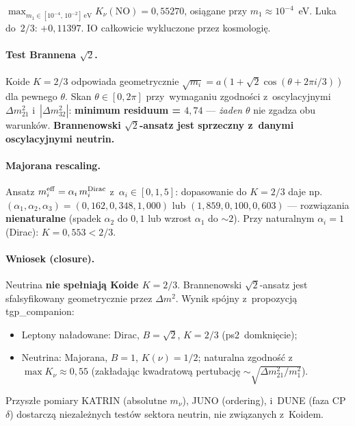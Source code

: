\noindent
$\boxed{\max_{m_1 \in [10^{-4},\,10^{-2}]~\mathrm{eV}} K_\nu(\text{NO}) = 0{,}55270}$,
osi\k{a}gane przy $m_1 \approx 10^{-4}$~eV.
Luka do~$2/3$: $+0{,}11397$. IO ca\l{}kowicie wykluczone przez kosmologi\k{e}.

\paragraph{Test Brannena $\sqrt{2}$.}
Koide $K=2/3$ odpowiada geometrycznie
$\sqrt{m_i} = a(1+\sqrt{2}\cos(\theta+2\pi i/3))$ dla pewnego $\theta$.
Skan $\theta \in [0, 2\pi]$ przy~wymaganiu zgodno\'sci z~oscylacyjnymi
$\Delta m^2_{21}$ i~$|\Delta m^2_{32}|$:
\textbf{minimum residuum = $4{,}74$} --- \emph{\.zaden} $\theta$
nie zgadza obu warunk\'ow.
\textbf{Brannenowski $\sqrt{2}$-ansatz jest sprzeczny z~danymi
oscylacyjnymi neutrin.}

\paragraph{Majorana rescaling.}
Ansatz $m_i^{\rm eff} = \alpha_i\,m_i^{\rm Dirac}$ z~$\alpha_i\in[0{,}1,5]$:
dopasowanie do $K=2/3$ daje np.\ $(\alpha_1,\alpha_2,\alpha_3)=(0{,}162, 0{,}348, 1{,}000)$
lub $(1{,}859, 0{,}100, 0{,}603)$ --- rozwi\k{a}zania \textbf{nienaturalne}
(spadek $\alpha_2$ do $0{,}1$ lub wzrost $\alpha_1$ do $\sim 2$).
Przy naturalnym $\alpha_i = 1$ (Dirac): $K=0{,}553 < 2/3$.

\paragraph{Wniosek (closure).}
Neutrina \textbf{nie spe\l{}niaj\k{a} Koide $K=2/3$}. Brannenowski
$\sqrt{2}$-ansatz jest sfalsyfikowany geometrycznie przez
$\Delta m^2$. Wynik spójny z~propozycj\k{a} tgp\_companion:
\begin{itemize}\itemsep0pt
  \item Leptony na\l{}adowane: Dirac, $B=\sqrt{2}$, $K=2/3$ (ps2~domkni\k{e}cie);
  \item Neutrina: Majorana, $B=1$, $K(\nu)=1/2$;
    naturalna zgodno\'s\'c z~$\max K_\nu \approx 0{,}55$
    (zak\l{}adaj\k{a}c kwadratow\k{a} pertubacj\k{e} $\sim \sqrt{\Delta m^2_{21}/m_1^2}$).
\end{itemize}
Przysz\l{}e pomiary KATRIN (absolutne $m_\nu$), JUNO (ordering),
i~DUNE (faza CP $\delta$) dostarcz\k{a} niezale\.znych test\'ow
sektora neutrin, nie zwi\k{a}zanych z~Koidem.

